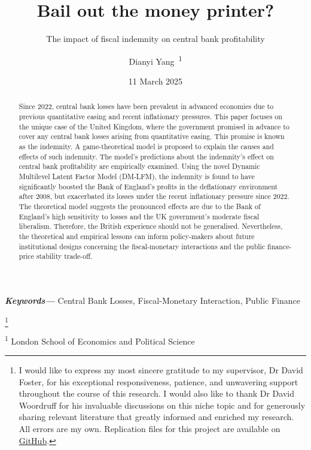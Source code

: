 \documentclass[
  a4paper,
  abstract=true]{scrartcl}
\title{Bail out the money printer?}
\subtitle{The impact of fiscal indemnity on central bank profitability}
\author{Dianyi Yang~\orcidlink{0009-0004-4652-3429}\textsuperscript{1}}
\date{11 March 2025}
\providecommand{\keywords}[1]
{
  \small	
  \textbf
{\textit{Keywords---}} #1
}
\newcommand\blfootnote[1]{%
  \begingroup

  \renewcommand\thefootnote{}\footnote{#1}%
  \addtocounter{footnote}{-1}%
  \endgroup }
\theoremstyle{definition}
\begin{document}
\maketitle
\begin{abstract}
Since 2022, central bank losses have been prevalent in advanced
economies due to previous quantitative easing and recent inflationary
pressures. This paper focuses on the unique case of the United Kingdom,
where the government promised in advance to cover any central bank
losses arising from quantitative easing. This promise is known as the
indemnity. A game-theoretical model is proposed to explain the causes
and effects of such indemnity. The model's predictions about the
indemnity's effect on central bank profitability are empirically
examined. Using the novel Dynamic Multilevel Latent Factor Model
(DM-LFM), the indemnity is found to have significantly boosted the Bank
of England's profits in the deflationary environment after 2008, but
exacerbated its losses under the recent inflationary pressure since
2022. The theoretical model suggests the pronounced effects are due to
the Bank of England's high sensitivity to losses and the UK government's
moderate fiscal liberalism. Therefore, the British experience should not
be generalised. Nevertheless, the theoretical and empirical lessons can
inform policy-makers about future institutional designs concerning the
fiscal-monetary interactions and the public finance-price stability
trade-off.
\end{abstract}
\begin{center}
\keywords{Central Bank Losses, Fiscal-Monetary Interaction, Public
Finance}
\end{center}

\blfootnote{I would like to express my most sincere gratitude to my
supervisor, Dr David Foster, for his exceptional responsiveness,
patience, and unwavering support throughout the course of this research.
I would also like to thank Dr David Woordruff for his invaluable
discussions on this niche topic and for generously sharing relevant
literature that greatly informed and enriched my research. All errors
are my own. Replication files for this project are available on
\href{https://github.com/kv9898/BailoutCB}{GitHub}.}




\textsuperscript{1} London School of Economics and Political Science

\newpage
\end{document}
